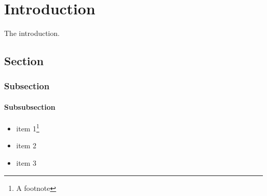 \chapter{Introduction}


The introduction.

\section{Section}

\subsection{Subsection}

\subsubsection{Subsubsection}

\begin{itemize}
\item item 1\footnote{A footnote}
\item item 2
\item item 3
\end{itemize}






